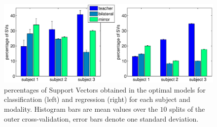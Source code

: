 \begin{figure}[!ht] \centering
  \includegraphics[width=\textwidth]{figs/figSVs}
  \caption{percentages of Support Vectors obtained in the optimal models
  	for classification (left) and regression (right) for each subject and modality.
    Histogram bars are mean values over the $10$ splits of
    the outer cross-validation, error bars denote one standard deviation.}
  \label{fig:SVs}
\end{figure}
